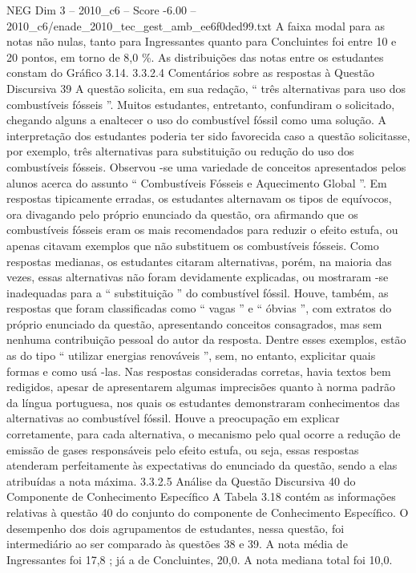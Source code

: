 \begin{textsample}{NEG Dim 3 – 2010\_c6 – Score -6.00 – 2010\_c6/enade\_2010\_tec\_gest\_amb\_ee6f0ded99.txt}
A faixa modal para as notas não nulas, tanto para Ingressantes quanto para Concluintes foi entre 10 e 20 pontos, em torno de 8,0 \%.
As distribuições das notas entre os estudantes constam do Gráfico 3.14. 3.3.2.4 Comentários sobre as respostas à Questão Discursiva 39 A questão solicita, em sua redação, “ três alternativas para uso dos combustíveis fósseis ”.
Muitos estudantes, entretanto, confundiram o solicitado, chegando alguns a enaltecer o uso do combustível fóssil como uma solução.
A interpretação dos estudantes poderia ter sido favorecida caso a questão solicitasse, por exemplo, três alternativas para substituição ou redução do uso dos combustíveis fósseis.
Observou -se uma variedade de conceitos apresentados pelos alunos acerca do assunto “ Combustíveis Fósseis e Aquecimento Global ”.
Em respostas tipicamente erradas, os estudantes alternavam os tipos de equívocos, ora divagando pelo próprio enunciado da questão, ora afirmando que os combustíveis fósseis eram os mais recomendados para reduzir o efeito estufa, ou apenas citavam exemplos que não substituem os combustíveis fósseis.
Como respostas medianas, os estudantes citaram alternativas, porém, na maioria das vezes, essas alternativas não foram devidamente explicadas, ou mostraram -se inadequadas para a “ substituição ” do combustível fóssil.
Houve, também, as respostas que foram classificadas como “ vagas ” e “ óbvias ”, com extratos do próprio enunciado da questão, apresentando conceitos consagrados, mas sem nenhuma contribuição pessoal do autor da resposta.
Dentre esses exemplos, estão as do tipo “ utilizar energias renováveis ”, sem, no entanto, explicitar quais formas e como usá -las.
Nas respostas consideradas corretas, havia textos bem redigidos, apesar de apresentarem algumas imprecisões quanto à norma padrão da língua portuguesa, nos quais os estudantes demonstraram conhecimentos das alternativas ao combustível fóssil.
Houve a preocupação em explicar corretamente, para cada alternativa, o mecanismo pelo qual ocorre a redução de emissão de gases responsáveis pelo efeito estufa, ou seja, essas respostas atenderam perfeitamente às expectativas do enunciado da questão, sendo a elas atribuídas a nota máxima. 3.3.2.5 Análise da Questão Discursiva 40 do Componente de Conhecimento Específico A Tabela 3.18 contém as informações relativas à questão 40 do conjunto do componente de Conhecimento Específico.
O desempenho dos dois agrupamentos de estudantes, nessa questão, foi intermediário ao ser comparado às questões 38 e 39.
A nota média de Ingressantes foi 17,8 ; já a de Concluintes, 20,0.
A nota mediana total foi 10,0.

\end{textsample}
